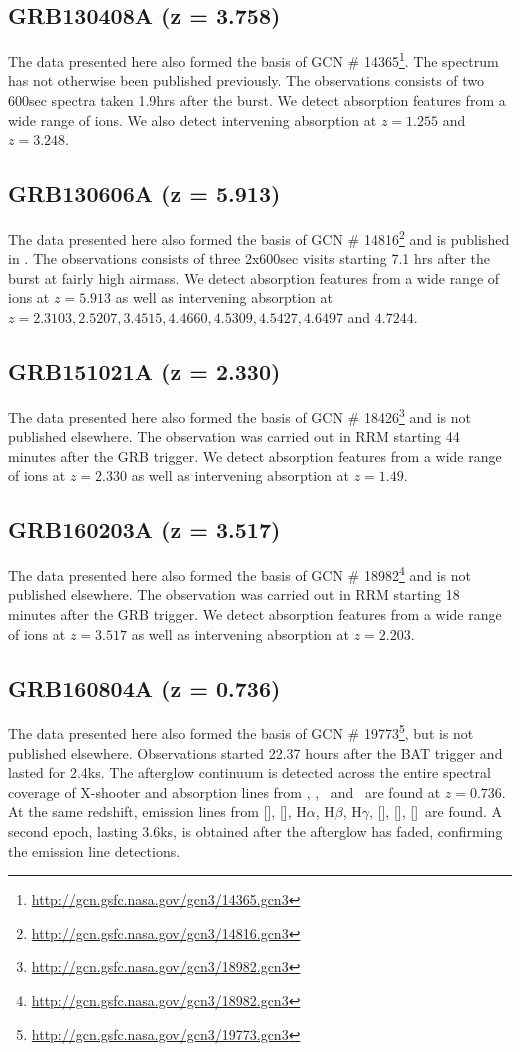 \documentclass[iop, twocolappendix, numberedappendix, tighten, appendixfloats]{emulateapj}
\newcommand{\hb}{H$\beta$}
\newcommand{\ha}{H$\alpha$}
\newcommand{\hg}{H$\gamma$}
\newcommand{\sii}{[\ion{S}{2}]}
\newcommand{\siii}{[\ion{S}{3}]}
\newcommand{\oii}{[\ion{O}{2}]}
\newcommand{\oiii}{[\ion{O}{3}]}
\newcommand{\nii}{[\ion{N}{2}]}
\newcommand{\feii}{\ion{Fe}{2}}
\newcommand{\mgi}{\ion{Mg}{1}}
\newcommand{\mgii}{\ion{Mg}{2}}
\newcommand{\alii}{\ion{Al}{2}}
\begin{document}
    \subsection{GRB130408A (z = 3.758)}
	The data presented here also formed the basis of GCN \#
	14365\footnote{\url{http://gcn.gsfc.nasa.gov/gcn3/14365.gcn3}}. The spectrum
	has not otherwise been published previously. The observations consists of two
	600sec spectra taken 1.9hrs after the burst. We detect absorption features from
	a wide range of ions. We also detect intervening absorption at $z=1.255$ and
	$z=3.248$.
	
	\subsection{GRB130606A (z = 5.913)}
	The data presented here also formed the basis of GCN \#
	14816\footnote{\url{http://gcn.gsfc.nasa.gov/gcn3/14816.gcn3}} and is published
	in \citet{Hartoog2015}. The observations consists of three 2x600sec visits
	starting 7.1 hrs after the burst at fairly high airmass. We detect absorption
	features from a wide range of ions at $z=5.913$ as well as intervening
	absorption at $z=2.3103, 2.5207, 3.4515, 4.4660, 4.5309, 4.5427, 4.6497 $ and $
	4.7244$.

	\subsection{GRB151021A (z = 2.330)}
	The data presented here also formed the basis of GCN \#
	18426\footnote{\url{http://gcn.gsfc.nasa.gov/gcn3/18982.gcn3}} and is not
	published elsewhere. The observation was carried out in RRM starting 44 minutes
	after the GRB trigger. We detect absorption features from a wide range of ions
	at $z=2.330$ as well as intervening absorption at $z=1.49$.

	\subsection{GRB160203A (z = 3.517)}
	The data presented here also formed the basis of GCN \#
	18982\footnote{\url{http://gcn.gsfc.nasa.gov/gcn3/18982.gcn3}} and is not
	published elsewhere. The observation was carried out in RRM starting 18 minutes
	after the GRB trigger. We detect absorption features from a wide range of ions
	at $z=3.517$ as well as intervening absorption at $z=2.203$.

	\subsection{GRB160804A (z = 0.736)}
	The data presented here also formed the basis of GCN \#
	19773\footnote{\url{http://gcn.gsfc.nasa.gov/gcn3/19773.gcn3}}, but is not
	published elsewhere. Observations started 22.37 hours after the BAT trigger and
	lasted for 2.4ks. The afterglow continuum is detected across the entire
	spectral coverage of X-shooter and absorption lines from \mgi, \mgii, \feii~and
	\alii~are found at $z = 0.736$. At the same redshift, emission lines from \oii,
	\oiii, \ha, \hb, \hg, \nii, \sii, \siii~are found. A second epoch, lasting
	3.6ks, is obtained after the afterglow has faded, confirming the emission line
	detections.
\end{document}
